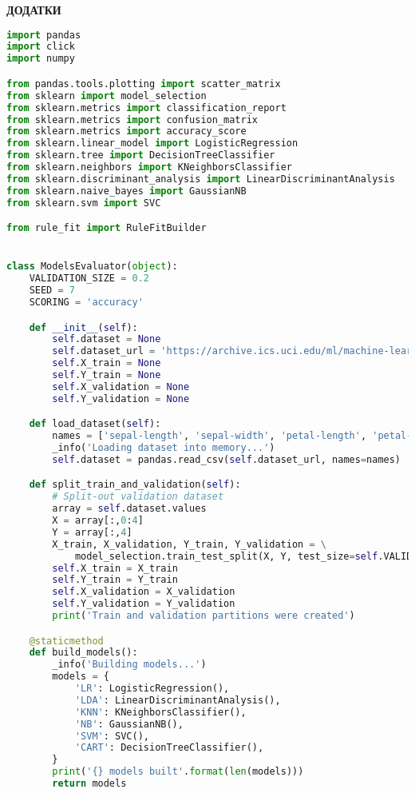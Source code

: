 \documentclass[a4paper,14pt]{extarticle}
\begin{document}
\begin{center}
    \textbf{\uppercase{Додатки}}
\end{center}

\begin{lstlisting}[language=Python, caption=Побудова базових моделей та вибір найкращої з них]
import pandas
import click
import numpy

from pandas.tools.plotting import scatter_matrix
from sklearn import model_selection
from sklearn.metrics import classification_report
from sklearn.metrics import confusion_matrix
from sklearn.metrics import accuracy_score
from sklearn.linear_model import LogisticRegression
from sklearn.tree import DecisionTreeClassifier
from sklearn.neighbors import KNeighborsClassifier
from sklearn.discriminant_analysis import LinearDiscriminantAnalysis
from sklearn.naive_bayes import GaussianNB
from sklearn.svm import SVC

from rule_fit import RuleFitBuilder


class ModelsEvaluator(object):
    VALIDATION_SIZE = 0.2
    SEED = 7
    SCORING = 'accuracy'

    def __init__(self):
        self.dataset = None
        self.dataset_url = 'https://archive.ics.uci.edu/ml/machine-learning-databases/iris/iris.data'
        self.X_train = None
        self.Y_train = None
        self.X_validation = None
        self.Y_validation = None

    def load_dataset(self):
        names = ['sepal-length', 'sepal-width', 'petal-length', 'petal-width', 'class']
        _info('Loading dataset into memory...')
        self.dataset = pandas.read_csv(self.dataset_url, names=names)

    def split_train_and_validation(self):
        # Split-out validation dataset
        array = self.dataset.values
        X = array[:,0:4]
        Y = array[:,4]
        X_train, X_validation, Y_train, Y_validation = \
            model_selection.train_test_split(X, Y, test_size=self.VALIDATION_SIZE, random_state=self.SEED)
        self.X_train = X_train
        self.Y_train = Y_train
        self.X_validation = X_validation
        self.Y_validation = Y_validation
        print('Train and validation partitions were created')

    @staticmethod
    def build_models():
        _info('Building models...')
        models = {
            'LR': LogisticRegression(),
            'LDA': LinearDiscriminantAnalysis(),
            'KNN': KNeighborsClassifier(),
            'NB': GaussianNB(),
            'SVM': SVC(),
            'CART': DecisionTreeClassifier(),
        }
        print('{} models built'.format(len(models)))
        return models


\end{lstlisting}
\end{document}

